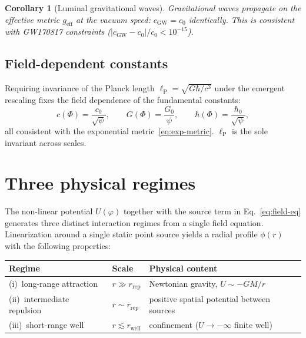 \documentclass[11pt,a4paper]{article}
\renewcommand{\Phi}{\varPhi}
\newcommand{\lP}{\ell_{\mathrm{P}}}
\newtheorem{corollary}[axiom]{Corollary}
\begin{document}
\begin{corollary}[Luminal gravitational waves]\label{cor:cGW}
Gravitational waves propagate on the effective metric $g_{\mathrm{eff}}$
at the vacuum speed: $c_{\mathrm{GW}}=c_{0}$ identically. This is
consistent with GW170817 constraints
($|c_{\mathrm{GW}}-c_{0}|/c_{0}<10^{-15}$).
\end{corollary}

\subsection{Field-dependent constants}

Requiring invariance of the Planck length $\lP=\sqrt{G\hbar/c^{3}}$
under the emergent rescaling fixes the field dependence of the
fundamental constants:
\begin{equation}\label{eq:constants}
  c(\Phi)=\frac{c_{0}}{\sqrt{\psi}},
  \qquad
  G(\Phi)=\frac{G_{0}}{\psi},
  \qquad
  \hbar(\Phi)=\frac{\hbar_{0}}{\sqrt{\psi}},
\end{equation}
all consistent with the exponential metric~\eqref{eq:exp-metric}. $\lP$
is the sole invariant across scales.

\section{Three physical regimes}\label{sec:regimes}

The non-linear potential $U(\varphi)$ together with the source term in
Eq.~\eqref{eq:field-eq} generates three distinct interaction regimes from a
single field equation. Linearization around a single static point source
yields a radial profile $\phi(r)$ with the following properties:

\begin{center}\small
\begin{tabular}{@{}lll@{}}
\toprule
\textbf{Regime} & \textbf{Scale} & \textbf{Physical content}\\
\midrule
(i)\ long-range attraction   & $r\gg r_{\mathrm{rep}}$ & Newtonian gravity, $U\sim -GM/r$\\
(ii)\ intermediate repulsion & $r\sim r_{\mathrm{rep}}$ & positive spatial potential between sources\\
(iii)\ short-range well      & $r\lesssim r_{\mathrm{well}}$ & confinement ($U\to-\infty$ finite well)\\
\bottomrule
\end{tabular}
\end{center}
\end{document}
